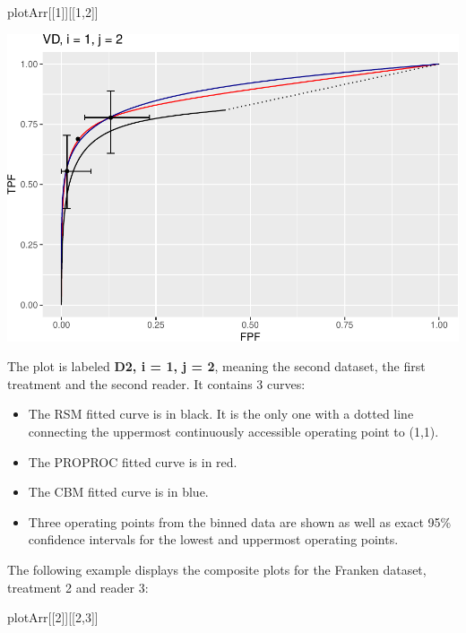 \documentclass[
]{book}
\newenvironment{Shaded}{\begin{snugshade}}{\end{snugshade}}
\newcommand{\DecValTok}[1]{\textcolor[rgb]{0.00,0.00,0.81}{#1}}
\newcommand{\NormalTok}[1]{#1}
\providecommand{\tightlist}{%
  \setlength{\itemsep}{0pt}\setlength{\parskip}{0pt}}
\begin{document}
\begin{Shaded}
\begin{Highlighting}[]
\NormalTok{plotArr[[}\DecValTok{1}\NormalTok{]][[}\DecValTok{1}\NormalTok{,}\DecValTok{2}\NormalTok{]]}
\end{Highlighting}
\end{Shaded}

\includegraphics{19b-rsm-3-fits_files/figure-latex/unnamed-chunk-2-1.pdf}

The plot is labeled \textbf{D2, i = 1, j = 2}, meaning the second dataset, the first treatment and the second reader. It contains 3 curves:

\begin{itemize}
\tightlist
\item
  The RSM fitted curve is in black. It is the only one with a dotted line connecting the uppermost continuously accessible operating point to (1,1).
\item
  The PROPROC fitted curve is in red.
\item
  The CBM fitted curve is in blue.
\item
  Three operating points from the binned data are shown as well as exact 95\% confidence intervals for the lowest and uppermost operating points.
\end{itemize}

The following example displays the composite plots for the Franken dataset, treatment 2 and reader 3:

\begin{Shaded}
\begin{Highlighting}[]
\NormalTok{plotArr[[}\DecValTok{2}\NormalTok{]][[}\DecValTok{2}\NormalTok{,}\DecValTok{3}\NormalTok{]]}
\end{Highlighting}
\end{Shaded}
\end{document}
